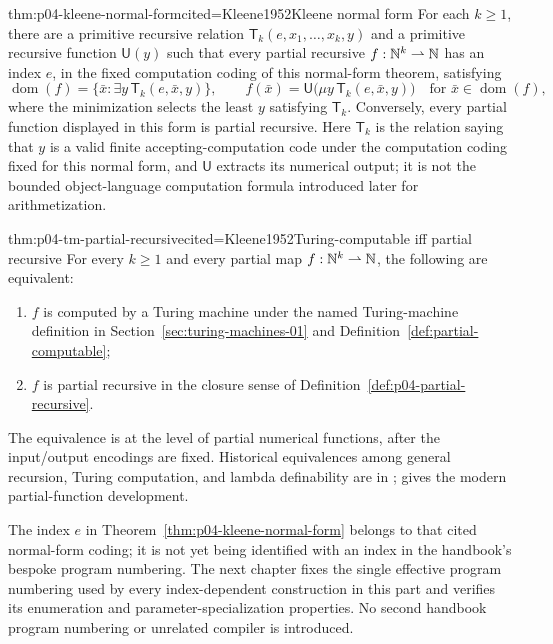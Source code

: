 \begin{hbtheorem}{thm:p04-kleene-normal-form}{cited=Kleene1952}{Kleene normal form}
For each \(k\ge1\), there are a primitive recursive relation
\(\mathsf T_k(e,x_1,\ldots,x_k,y)\) and a primitive recursive function
\(\mathsf U(y)\) such that every partial recursive
\(f:\mathbb{N}^k\rightharpoonup\mathbb{N}\) has an index \(e\), in the fixed computation
coding of this normal-form theorem, satisfying
\[
  \operatorname{dom}(f)
  =\{\bar x:\exists y\,\mathsf T_k(e,\bar x,y)\},
  \qquad
  f(\bar x)=\mathsf U\bigl(\mu y\,
    \mathsf T_k(e,\bar x,y)\bigr)
  \quad\text{for }\bar x\in\operatorname{dom}(f),
\]
where the minimization selects the least \(y\) satisfying \(\mathsf T_k\).
Conversely, every partial function displayed in this form is partial
recursive.  Here \(\mathsf T_k\) is the relation saying that \(y\) is a valid
finite accepting-computation code under the computation coding fixed for this
normal form, and \(\mathsf U\) extracts its numerical output; it is not the
bounded object-language computation formula introduced later for
arithmetization.
\end{hbtheorem}

\begin{hbtheorem}{thm:p04-tm-partial-recursive}{cited=Kleene1952}{Turing-computable iff partial recursive}
For every \(k\ge1\) and every partial map
\(f:\mathbb{N}^k\rightharpoonup\mathbb{N}\), the following are equivalent:
\begin{enumerate}
  \item \(f\) is computed by a Turing machine under
        the named Turing-machine definition in
        Section~\ref{sec:turing-machines-01} and
        Definition~\ref{def:partial-computable};
  \item \(f\) is partial recursive in the closure sense of
        Definition~\ref{def:p04-partial-recursive}.
\end{enumerate}
\end{hbtheorem}

The equivalence is at the level of partial numerical functions, after the
input/output encodings are fixed.  Historical equivalences among general recursion,
Turing computation, and lambda definability are in
\cite{Kleene1936,Turing1937Lambda}; \cite{Kleene1952} gives the modern
partial-function development.

The index \(e\) in Theorem~\ref{thm:p04-kleene-normal-form} belongs to that
cited normal-form coding; it is not yet being identified with an index in the
handbook's bespoke program numbering.  The next chapter fixes the single
effective program numbering used by every index-dependent construction in this
part and verifies its enumeration and parameter-specialization properties.  No
second handbook program numbering or unrelated compiler is introduced.

